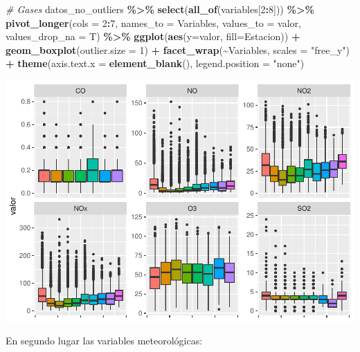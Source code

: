 \documentclass[notspecified,article,submit,moreauthors,pdftex]{Definitions/mdpi}
\newenvironment{Shaded}{\begin{snugshade}}{\end{snugshade}}
\newcommand{\AttributeTok}[1]{\textcolor[rgb]{0.13,0.29,0.53}{#1}}
\newcommand{\CommentTok}[1]{\textcolor[rgb]{0.56,0.35,0.01}{\textit{#1}}}
\newcommand{\DecValTok}[1]{\textcolor[rgb]{0.00,0.00,0.81}{#1}}
\newcommand{\FunctionTok}[1]{\textcolor[rgb]{0.13,0.29,0.53}{\textbf{#1}}}
\newcommand{\NormalTok}[1]{#1}
\newcommand{\SpecialCharTok}[1]{\textcolor[rgb]{0.81,0.36,0.00}{\textbf{#1}}}
\newcommand{\StringTok}[1]{\textcolor[rgb]{0.31,0.60,0.02}{#1}}
\begin{document}
\begin{Shaded}
\begin{Highlighting}[]
\CommentTok{\# Gases}
\NormalTok{datos\_no\_outliers }\SpecialCharTok{\%\textgreater{}\%}
  \FunctionTok{select}\NormalTok{(}\FunctionTok{all\_of}\NormalTok{(variables[}\DecValTok{2}\SpecialCharTok{:}\DecValTok{8}\NormalTok{])) }\SpecialCharTok{\%\textgreater{}\%}
  \FunctionTok{pivot\_longer}\NormalTok{(}\AttributeTok{cols =} \DecValTok{2}\SpecialCharTok{:}\DecValTok{7}\NormalTok{, }\AttributeTok{names\_to =} \StringTok{\textquotesingle{}Variables\textquotesingle{}}\NormalTok{, }\AttributeTok{values\_to =} \StringTok{\textquotesingle{}valor\textquotesingle{}}\NormalTok{, }\AttributeTok{values\_drop\_na =}\NormalTok{ T) }\SpecialCharTok{\%\textgreater{}\%}
  \FunctionTok{ggplot}\NormalTok{(}\FunctionTok{aes}\NormalTok{(}\AttributeTok{y=}\NormalTok{valor, }\AttributeTok{fill=}\NormalTok{Estacion)) }\SpecialCharTok{+} 
  \FunctionTok{geom\_boxplot}\NormalTok{(}\AttributeTok{outlier.size =} \DecValTok{1}\NormalTok{) }\SpecialCharTok{+}
  \FunctionTok{facet\_wrap}\NormalTok{(}\SpecialCharTok{\textasciitilde{}}\NormalTok{Variables, }\AttributeTok{scales =} \StringTok{"free\_y"}\NormalTok{) }\SpecialCharTok{+} 
  \FunctionTok{theme}\NormalTok{(}\AttributeTok{axis.text.x =} \FunctionTok{element\_blank}\NormalTok{(), }\AttributeTok{legend.position =} \StringTok{"none"}\NormalTok{)}
\end{Highlighting}
\end{Shaded}

\includegraphics{ProyectoAED2023_plantilla_files/figure-latex/unnamed-chunk-19-1.pdf}

En segundo lugar las variables meteorológicas:
\end{document}

